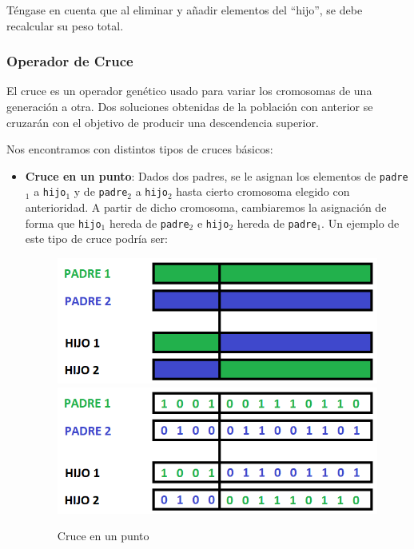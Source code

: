 Téngase en cuenta que al eliminar y añadir elementos del ``hijo'', se debe recalcular su peso total.

\subsubsection{Operador de Cruce}

El cruce es un operador genético usado para variar los cromosomas de una generación a otra. 
Dos soluciones obtenidas de la población con anterior se cruzarán con el objetivo de producir una descendencia superior. 

Nos encontramos con distintos tipos de cruces básicos:
\begin{itemize}
	\item \textbf{Cruce en un punto}:  Dados dos padres, se le asignan los elementos de \texttt{padre$_1$} a \texttt{hijo$_1$} y de \texttt{padre$_2$} a \texttt{hijo$_2$} hasta cierto cromosoma elegido con anterioridad. 
A partir de dicho cromosoma, cambiaremos la asignación de forma que \texttt{hijo$_1$} hereda de \texttt{padre$_2$} e \texttt{hijo$_2$} hereda de \texttt{padre$_1$}. 
Un ejemplo de este tipo de cruce podría ser:

\begin{figure}[H]
		\centering
		\includegraphics[scale=0.5]{imagenes/Crossover1point.png}
		\includegraphics[scale=0.5]{imagenes/Crossover1pointNumber.png}
        \caption{Cruce en un punto}
        \label{fig:Crossover1}
\end{figure}


\end{itemize}
